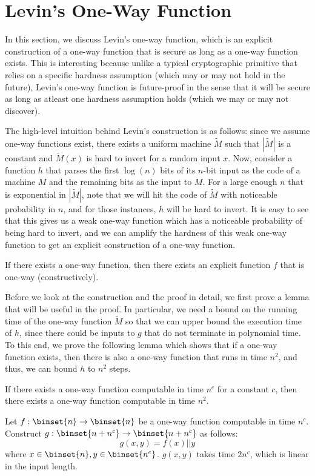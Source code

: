 \documentclass[12pt]{tufte-book}
\begin{document}
\section{Levin's One-Way Function}
\label{sec:levin-owf}
In this section, we discuss Levin's one-way function, which is an explicit construction of a one-way function that is secure as long as a one-way function exists.
This is interesting because unlike a typical cryptographic primitive that relies on a specific hardness assumption (which may or may not hold in the future), Levin's one-way function is future-proof in the sense that it will be secure as long as atleast one hardness assumption holds (which we may or may not discover).

The high-level intuition behind Levin's construction is as follows: since we assume one-way functions exist, there exists a uniform machine $\tilde M$ such that $|\tilde M|$ is a constant and $\tilde M(x)$ is hard to invert for a random input $x$.
Now, consider a function $h$ that parses the first $\log(n)$ bits of its $n$-bit input as the code of a machine $M$ and the remaining bits as the input to $M$.
For a large enough $n$ that is exponential in $|\tilde{M}|$, note that we will hit the code of $\tilde{M}$ with noticeable probability in $n$, and for those instances, $h$ will be hard to invert.
It is easy to see that this gives us a weak one-way function which has a noticeable probability of being hard to invert, and we can amplify the hardness of this weak one-way function to get an explicit construction of a one-way function.

\begin{theorem}\label{thm:levin}
If there exists a one-way function, then there exists an explicit function $f$ that is one-way  (constructively).
\end{theorem}

Before we look at the construction and the proof in detail, we first prove a lemma that will be useful in the proof.
In particular, we need a bound on the running time of the one-way function $\tilde M$ so that we can upper bound the execution time of $h$, since there could be inputs to $g$ that do not terminate in polynomial time.
To this end, we prove the following lemma which shows that if a one-way function exists, then there is also a one-way function that runs in time $n^2$, and thus, we can bound $h$ to $n^2$ steps.

\begin{lemma}\label{lem:n2owf}
If there exists a one-way function computable in time $n^c$ for a constant $c$, then there exists a one-way function computable in time $n^2$.
\end{lemma}
\proof
Let $f: \binset{n} \rightarrow \binset{n}$ be a one-way function computable in time $n^c$.
Construct $g: \binset{n+n^c} \rightarrow \binset{n+n^c}$ as follows:
$$g(x,y) = f(x) || y$$
where $x \in \binset{n}, y \in \binset{n^c}$.
$g(x,y)$ takes time $2n^c$, which is linear in the input length.
\end{document}
